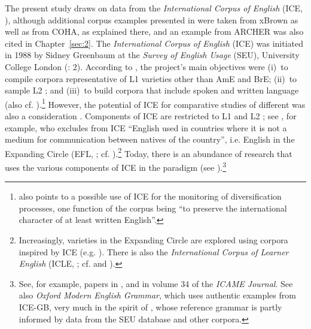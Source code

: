 The present study draws on data from the \textit{International Corpus of English} (ICE, \citealt{KirkNelson2018}), although additional corpus examples presented in  were taken from xBrown as well as from COHA, as explained there, and an example from ARCHER was also cited in Chapter~\ref{sec:2}. The \textit{International Corpus of English} (ICE) was initiated in 1988 by Sidney Greenbaum at the \textit{Survey of English Usage} (SEU), University College London (\citealt{NelsonWallisAarts2002}: 2). According to \citet{Greenbaum1988}, the project’s main objectives were
(i)~to compile corpora representative of L1 varieties other than AmE and BrE;
(ii)~to sample L2 ; and
(iii)~to build corpora that include spoken and written language (also cf. \citealt{Greenbaum1991}).\footnote{\citet[4]{Greenbaum1991} also points to a possible use of ICE for the monitoring of diversification processes, one function of the corpus being “to preserve the international character of at least written English”.} However, the potential of ICE for comparative studies of different  was also a consideration \parencites[4]{Greenbaum1991}[10]{Greenbaum1996}. Components of ICE are restricted to L1 and L2 ; see \citet[4]{Greenbaum1996}, for example, who excludes from ICE “English used in countries where it is not a medium for communication between natives of the country”, i.e. English in the Expanding Circle (EFL, \citealt{Kachru1985,Kachru1988}; cf. ).\footnote{Increasingly, varieties in the Expanding Circle are explored using corpora inspired by ICE (e.g. \citealt{Edwards2016,Laitinen2010}). There is also the \textit{International Corpus of Learner English} (ICLE, \citealt{GrangerEtAl2009}; cf. \citealt{Greenbaum1996} and \citealt{Granger1996}).} Today, there is an abundance of research that uses the various components of ICE in the  paradigm (see ).\footnote{See, for example, papers in \citet{HundtGut2012,SeoaneSuárez-Gómez2016,HoffmannSiebers2009}, and in volume 34 of the \textit{ICAME Journal}. See also  \textit{Oxford Modern English Grammar}, which uses authentic examples from ICE-GB, very much in the spirit of \citet[33]{QuirkEtAl1985}, whose reference grammar is partly informed by data from the SEU database and other corpora.}


